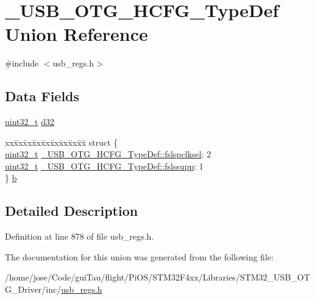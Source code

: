 \hypertarget{union___u_s_b___o_t_g___h_c_f_g___type_def}{\section{\-\_\-\-U\-S\-B\-\_\-\-O\-T\-G\-\_\-\-H\-C\-F\-G\-\_\-\-Type\-Def Union Reference}
\label{union___u_s_b___o_t_g___h_c_f_g___type_def}
}


{\ttfamily \#include $<$usb\-\_\-regs.\-h$>$}

\subsection*{Data Fields}
\begin{DoxyCompactItemize}
\item 
\hyperlink{stdint_8h_a435d1572bf3f880d55459d9805097f62}{uint32\-\_\-t} \hyperlink{group___u_s_b___o_t_g___d_r_i_v_e_r_gacb1cab2cc5eb22cbf50cddd4c5409015}{d32}
\item 
\begin{tabbing}
xx\=xx\=xx\=xx\=xx\=xx\=xx\=xx\=xx\=\kill
struct \{\\
\>\hyperlink{stdint_8h_a435d1572bf3f880d55459d9805097f62}{uint32\_t} \hyperlink{group___u_s_b___o_t_g___d_r_i_v_e_r_ga7af45d13cc9d2b0911a4519f2285e480}{\_USB\_OTG\_HCFG\_TypeDef::fslspclksel}: 2\\
\>\hyperlink{stdint_8h_a435d1572bf3f880d55459d9805097f62}{uint32\_t} \hyperlink{group___u_s_b___o_t_g___d_r_i_v_e_r_ga18cb42f24eb7ab51021d52bbfe6ca281}{\_USB\_OTG\_HCFG\_TypeDef::fslssupp}: 1\\
\} \hyperlink{group___u_s_b___o_t_g___d_r_i_v_e_r_ga420c63f8a9ec0774dee5fb987abf3375}{b}\\

\end{tabbing}\end{DoxyCompactItemize}


\subsection{Detailed Description}


Definition at line 878 of file usb\-\_\-regs.\-h.



The documentation for this union was generated from the following file\-:\begin{DoxyCompactItemize}
\item 
/home/jose/\-Code/gui\-Tau/flight/\-Pi\-O\-S/\-S\-T\-M32\-F4xx/\-Libraries/\-S\-T\-M32\-\_\-\-U\-S\-B\-\_\-\-O\-T\-G\-\_\-\-Driver/inc/\hyperlink{_s_t_m32_f4xx_2_libraries_2_s_t_m32___u_s_b___o_t_g___driver_2inc_2usb__regs_8h}{usb\-\_\-regs.\-h}\end{DoxyCompactItemize}
